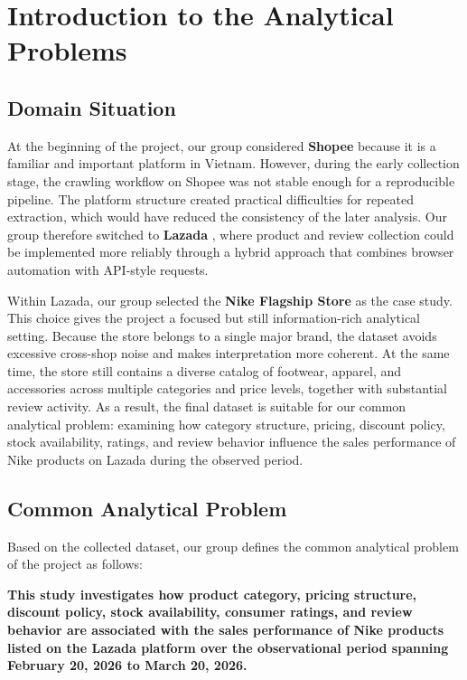 \section{Introduction to the Analytical Problems}
\subsection{Domain Situation}
At the beginning of the project, our group considered \textbf{Shopee} because it is a familiar and important platform in Vietnam. However, during the early collection stage, the crawling workflow on Shopee was not stable enough for a reproducible pipeline. The platform structure created practical difficulties for repeated extraction, which would have reduced the consistency of the later analysis. Our group therefore switched to \textbf{Lazada} \cite{lazada}, where product and review collection could be implemented more reliably through a hybrid approach that combines browser automation with API-style requests.

Within Lazada, our group selected the \textbf{Nike Flagship Store} as the case study. This choice gives the project a focused but still information-rich analytical setting. Because the store belongs to a single major brand, the dataset avoids excessive cross-shop noise and makes interpretation more coherent. At the same time, the store still contains a diverse catalog of footwear, apparel, and accessories across multiple categories and price levels, together with substantial review activity. As a result, the final dataset is suitable for our common analytical problem: examining how category structure, pricing, discount policy, stock availability, ratings, and review behavior influence the sales performance of Nike products on Lazada during the observed period.

\subsection{Common Analytical Problem}
Based on the collected dataset, our group defines the common analytical problem of the project as follows:

\textbf{This study investigates how product category, pricing structure, discount policy, stock availability, consumer ratings, and review behavior are associated with the sales performance of Nike products listed on the Lazada platform over the observational period spanning February 20, 2026 to March 20, 2026.}

